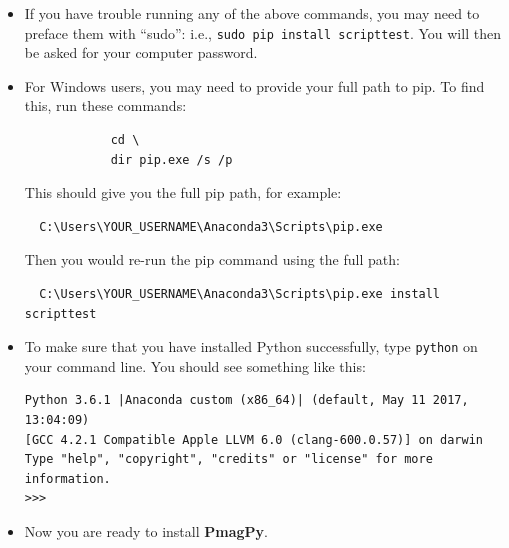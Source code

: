 \documentclass[11pt]{book}
\begin{document}
{\begin{itemize}
\begin{itemize}
   \item If you have trouble running any of the above commands, you may need to preface them with ``sudo'': i.e., \texttt{sudo pip install scripttest}.  You will then be asked for your computer password.
   \item For Windows users, you may need to provide your full path to pip.  To find this, run these commands: \begin{verbatim}
            cd \
            dir pip.exe /s /p \end{verbatim}
     This should give you the full pip path, for example: \begin{verbatim}
  C:\Users\YOUR_USERNAME\Anaconda3\Scripts\pip.exe
\end{verbatim}
     Then you would re-run the pip command using the full path: \begin{verbatim}
  C:\Users\YOUR_USERNAME\Anaconda3\Scripts\pip.exe install scripttest
  \end{verbatim}

   \item To make sure that you have installed Python successfully, type \texttt{python} on your command line.  You should see something like this: \begin{verbatim}
Python 3.6.1 |Anaconda custom (x86_64)| (default, May 11 2017, 13:04:09)
[GCC 4.2.1 Compatible Apple LLVM 6.0 (clang-600.0.57)] on darwin
Type "help", "copyright", "credits" or "license" for more information.
>>>\end{verbatim}
  \item Now you are ready to install {\bf PmagPy}.


\end{itemize}
\end{itemize}}
\end{document}
